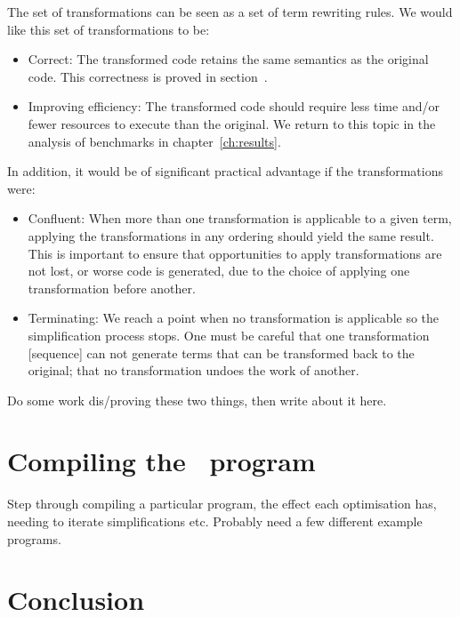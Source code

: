 The set of transformations can be seen as a set of term rewriting rules. We
would like this set of transformations to be:
%
\begin{itemize}
    \item Correct: The transformed code retains the same semantics as the
        original code. This correctness is proved in
        section~\derp.

    \item Improving efficiency: The transformed code should require less time
        and/or fewer resources to execute than the original. We return to this
        topic in the analysis of benchmarks in chapter~\ref{ch:results}.
\end{itemize}
%
In addition, it would be of significant practical advantage if the
transformations were:
%
\begin{itemize}
    \item Confluent: When more than one transformation is applicable to a given
        term, applying the transformations in any ordering should yield the same
        result. This is important to ensure that opportunities to apply
        transformations are not lost, or worse code is generated, due to
        the choice of applying one transformation before another.

    \item Terminating: We reach a point when no transformation is applicable so
        the simplification process stops. One must be careful that one
        transformation [sequence] can not generate terms that can be transformed
        back to the original; that no transformation undoes the work of another.
\end{itemize}

Do some work dis/proving these two things, then write about it here.


\section{Compiling the \derp\ program}

Step through compiling a particular program, the effect each optimisation has,
needing to iterate simplifications etc. Probably need a few different example
programs.

\section{Conclusion}

% 

